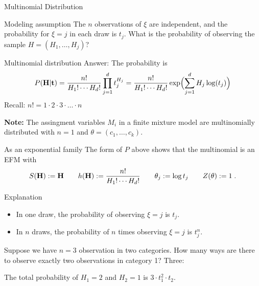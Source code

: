\documentclass[dvipsnames,mathserif]{beamer}
\begin{document}
{%

\def\t{\mathbf{t}}
\begin{frame}{Multinomial Distribution}
  \begin{block}{Modeling assumption}
    The $n$ observations of $\xi$ are independent, and the probability
    for $\xi=j$ in each draw is $t_j$. What is the probability of
    observing the sample $H=(H_1,\ldots,H_j)$?
  \end{block}
  \begin{block}{Multinomial distribution}
    Answer: The probability is
    \begin{equation*}
      P(\H|\t)=\frac{n!}{H_1!\cdots H_d!}\prod_{j=1}^d t_j^{H_j}
      =
      \frac{n!}{H_1!\cdots H_d!}\exp\Bigl(\sum_{j=1}^d H_j\log(t_j)\Bigr)
    \end{equation*}
    Recall: $n! = 1\cdot 2\cdot 3\cdot\ldots\cdot n$
  \end{block}
  \textbf{Note:} The assingment variables $M_i$ in a finite mixture
  model are multinomially distributed with $n=1$ and $\theta=(c_1,\ldots,c_k)$.
  \begin{block}{As an exponential family}
    The form of $P$ above shows that the multinomial is an EFM with
    \begin{equation*}
      S(\mathbf{H}):=\mathbf{H} \qquad h(\mathbf{H}):=\frac{n!}{H_1!\cdots H_d!} \qquad \theta_j:=\log t_j 
      \qquad Z(\theta):=1 \;.
    \end{equation*}
  \end{block}
\end{frame}

\begin{frame}{Explanation}
    \begin{itemize}
    \item In one draw, the probability of observing $\xi=j$ is $t_j$.
    \item In $n$ draws, the probability of $n$ times observing $\xi=j$
      is $t_j^n$.
    \end{itemize}
    Suppose we have $n=3$ observation in two categories. How many ways are
    there to observe exactly two observations in category 1? Three:
{\scriptsize
    \begin{center}
    \end{center}
}
    The total probability of $H_1=2$ and $H_2=1$ is $3\cdot t_1^2\cdot t_2$.
    \begin{itemize}


\end{itemize}
\end{frame}}
\end{document}
